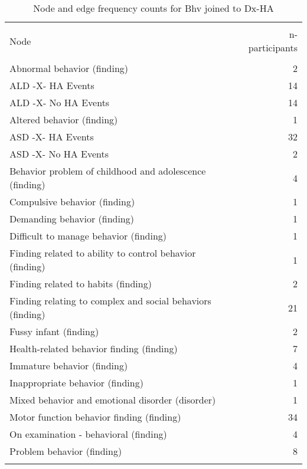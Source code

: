 \documentclass[10pt, letterpaper]{article}
\begin{document}
\begin{spacing}{1.0}
\begin{small}
    \begin{longtable}[H]{p{5in}r}
        \caption{Node and edge frequency counts for Bhv joined to Dx-HA}\\
        \hline\\[-8pt]
        Node & n-participants\\
        \hline\\[-6pt]
        Abnormal behavior (finding) & 2 \\
        \rowcolor{ltBlue}
        ALD -X- HA Events & 14 \\
        ALD -X- No HA Events & 14 \\
        \rowcolor{ltBlue}
        Altered behavior (finding) & 1 \\
        ASD -X- HA Events & 32 \\
        \rowcolor{ltBlue}
        ASD -X- No HA Events & 2 \\
        Behavior problem of childhood and adolescence (finding) & 4 \\
        \rowcolor{ltBlue}
        Compulsive behavior (finding) & 1 \\
        Demanding behavior (finding) & 1 \\
        \rowcolor{ltBlue}
        Difficult to manage behavior (finding) & 1 \\
        Finding related to ability to control behavior (finding) & 1 \\
        \rowcolor{ltBlue}
        Finding related to habits (finding) & 2 \\
        Finding relating to complex and social behaviors (finding) & 21 \\
        \rowcolor{ltBlue}
        Fussy infant (finding) & 2 \\
        Health-related behavior finding (finding) & 7 \\
        \rowcolor{ltBlue}
        Immature behavior (finding) & 4 \\
        Inappropriate behavior (finding) & 1 \\
        \rowcolor{ltBlue}
        Mixed behavior and emotional disorder (disorder) & 1 \\
        Motor function behavior finding (finding) & 34 \\
        \rowcolor{ltBlue}
        On examination - behavioral (finding) & 4 \\
        Problem behavior (finding) & 8 \\
        \rowcolor{ltBlue}

\end{longtable}
\end{small}
\end{spacing}
\end{document}
